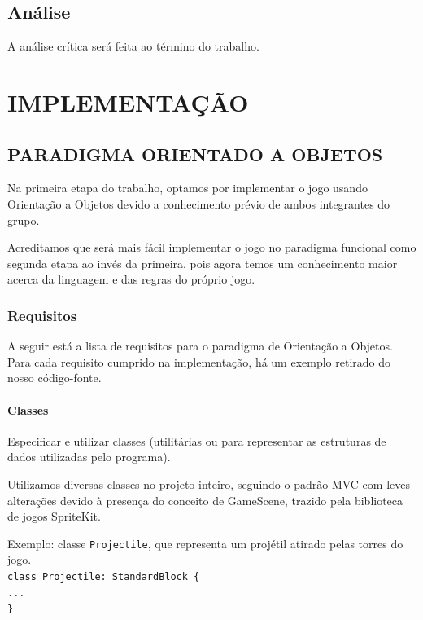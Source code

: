 \documentclass[rel_mlp]{iiufrgs}
\newcommand\tab[1][1cm]{\hspace*{#1}}
\begin{document}
\section{Análise}

A análise crítica será feita ao término do trabalho.


\chapter{IMPLEMENTAÇÃO} \label{intro}

\section{PARADIGMA ORIENTADO A OBJETOS} \label{intro}

Na primeira etapa do trabalho, optamos por implementar o jogo usando Orientação a Objetos devido a conhecimento prévio de ambos integrantes do grupo.

Acreditamos que será mais fácil implementar o jogo no paradigma funcional como segunda etapa ao invés da primeira, pois agora temos um conhecimento maior acerca da linguagem e das regras do próprio jogo.

\subsection{Requisitos}

A seguir está a lista de requisitos para o paradigma de Orientação a Objetos. Para cada requisito cumprido na implementação, há um exemplo retirado do nosso código-fonte.

\subsubsection{Classes}

Especificar e utilizar classes (utilitárias ou para representar as estruturas de dados utilizadas pelo programa).

Utilizamos diversas classes no projeto inteiro, seguindo o padrão MVC com leves alterações devido à presença do conceito de GameScene, trazido pela biblioteca de jogos SpriteKit.

Exemplo: classe \texttt{Projectile}, que representa um projétil atirado pelas torres do jogo.
\texttt{\\class Projectile: StandardBlock \{\\\tab ...\\\}}
\end{document}
